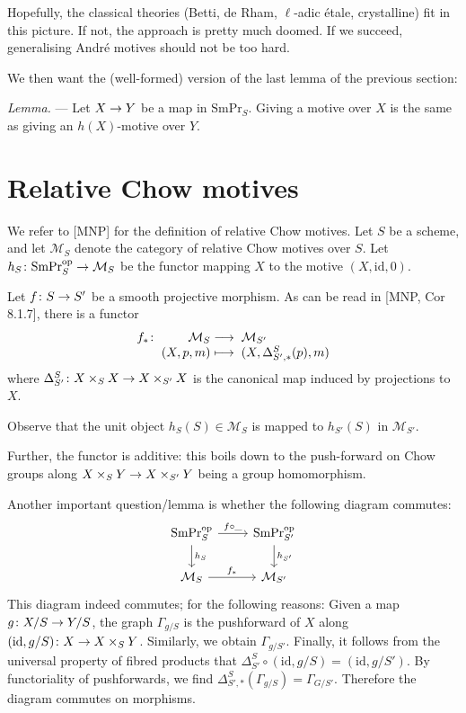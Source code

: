 \documentclass[a4paper,10pt]{article}
\newenvironment{lemma}{\medskip\textit{Lemma.} --- }{}
\def\smpr{\mathrm{SmPr}}
\begin{document}
Hopefully, the classical theories (Betti, de Rham, $\ell$-adic \'{e}tale,
crystalline) fit in this picture. If not, the approach is pretty much doomed.
If we succeed, generalising Andr\'{e} motives should not be too hard.

We then want the (well-formed) version of the last lemma of the previous
section:

\begin{lemma} %
	Let $\map{X}{Y}$ be a map in $\smpr_{S}$. Giving a motive over $X$ is
	the same as giving an $h(X)$-motive over $Y$.
\end{lemma} %

\section{Relative Chow motives}

We refer to [MNP] for the definition of relative Chow motives. Let $S$ be a
scheme, and let $\mathcal{M}_{S}$ denote the category of relative Chow motives
over $S$. Let $\map[h_{S}]{\smpr_{S}^{\mathrm{op}}}{\mathcal{M}_{S}}$ be the
functor mapping $X$ to the motive $(X, \mathrm{id}, 0)$.
	
Let $\map[f]{S}{S'}$ be a smooth projective morphism. As can be read in [MNP,
Cor 8.1.7], there is a functor
\[
	\map[f_{*}]{\mathcal{M}_{S}}{\mathcal{M}_{S'}}%
	[(X,p,m)][(X,\Delta^{S}_{S',*}(p),m)]
\]
where $\map[\Delta^{S}_{S'}]{X \times_{S} X}{X \times_{S'} X}$ is the canonical
map induced by projections to $X$.

Observe that the unit object $h_{S}(S) \in \mathcal{M}_{S}$ is mapped to
$h_{S'}(S)$ in $\mathcal{M}_{S'}$.

Further, the functor is additive: this boils down to the push-forward on Chow
groups along $\map{X \times_{S} Y}{X \times_{S'} Y}$ being a group
homomorphism.

Another important question/lemma is whether the following diagram commutes:
\[
	\begin{tikzcd} %
		\smpr_{S}^{\mathrm{op}} \rar{f \circ \_} \dar{h_{S}}
		& \smpr_{S'}^{\mathrm{op}} \dar{h_{S'}} \\
		\mathcal{M}_{S} \rar{f_{*}}
		& \mathcal{M}_{S'}
	\end{tikzcd} %
\]
This diagram indeed commutes; for the following reasons: Given a map
$\map[g]{X/S}{Y/S}$, the graph $\Gamma_{g/S}$ is the pushforward of $X$ along
$\map[(\mathrm{id},g/S)]{X}{X \times_{S} Y}$. Similarly, we obtain
$\Gamma_{g/S'}$. Finally, it follows from the universal property of fibred
products that $\Delta^{S}_{S'} \circ (\mathrm{id},g/S) = (\mathrm{id},g/S')$.
By functoriality of pushforwards, we find $\Delta^{S}_{S',*}(\Gamma_{g/S}) =
\Gamma_{G/S'}$. Therefore the diagram commutes on morphisms.
\end{document}
